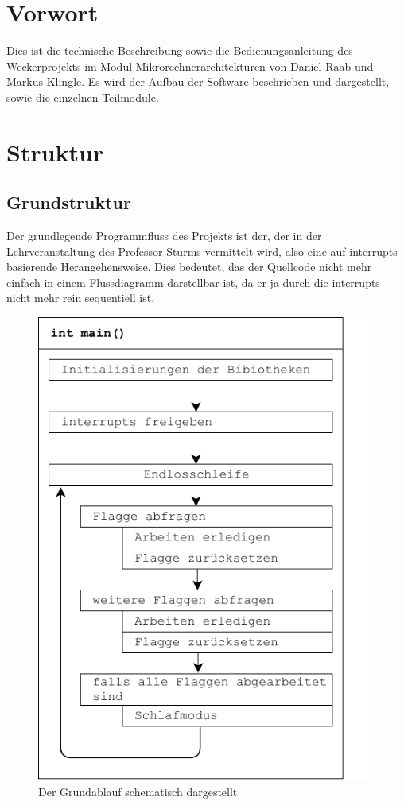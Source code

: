\section{Vorwort}
Dies ist die technische Beschreibung sowie die Bedienungsanleitung des Weckerprojekts im Modul Mikrorechnerarchitekturen von Daniel Raab und Markus Klingle. Es wird der Aufbau der Software beschrieben und dargestellt, sowie die einzelnen Teilmodule.
\section{Struktur}
\subsection{Grundstruktur}
Der grundlegende Programmfluss des Projekts ist der, der in der Lehrveranstaltung des Professor Sturms vermittelt wird, also eine auf interrupts basierende Herangehensweise. Dies bedeutet, das der Quellcode nicht mehr einfach in einem Flussdiagramm darstellbar ist, da er ja durch die interrupts nicht mehr rein sequentiell ist.
\begin{figure}[h]
    \centering
    \includegraphics{main_diagram.pdf}
    \caption{Der Grundablauf schematisch dargestellt}
    \label{img:grundablauf}
\end{figure}
